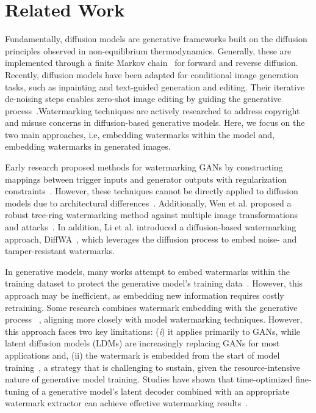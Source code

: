 \section{Related Work}
Fundamentally, diffusion models are generative frameworks built on the diffusion principles observed in non-equilibrium thermodynamics. Generally, these are implemented through a finite Markov chain~\citep{geyer1992practical} for forward and reverse diffusion. Recently, diffusion models have been adapted for conditional image generation tasks, such as inpainting and text-guided generation and editing. Their iterative de-noising steps enables zero-shot image editing by guiding the generative process~\citep{heusel2017gans,salimans2016improved,zhou2019hype}.Watermarking techniques are actively researched to address copyright and misuse concerns in diffusion-based generative models. Here, we focus on the two main approaches, i.e, embedding watermarks within the model and, embedding watermarks in generated images.

Early research proposed methods for watermarking GANs by constructing mappings between trigger inputs and generator outputs with regularization constraints~\citep{yu2021artificial,ong2021protecting,fei2022supervised}. However, these techniques cannot be directly applied to diffusion models due to architectural differences~\citep{creswell2018generative,cao2022survey}. Additionally, Wen et al. proposed a robust tree-ring watermarking method against multiple image transformations and attacks~\citep{wen2023tree}. In addition, Li et al. introduced a diffusion-based watermarking approach, DiffWA~\citep{li2023diffwa}, which leverages the diffusion process to embed noise- and tamper-resistant watermarks.

In generative models, many works attempt to embed watermarks within the training dataset to protect the generative model's training data~\citep{chai2020what}. However, this approach may be inefficient, as embedding new information requires costly retraining. Some research combines watermark embedding with the generative process ~\citep{gragnaniello2021are,wang2020cnn}, aligning more closely with model watermarking techniques. However, this approach faces two key limitations: (\textit{i}) it applies primarily to GANs, while latent diffusion models (LDMs) are increasingly replacing GANs for most applications and, (ii) the watermark is embedded from the start of model training~\citep{fei2022supervised,lin2022cycleganwm}, a strategy that is challenging to sustain, given the resource-intensive nature of generative model training. Studies have shown that time-optimized fine-tuning of a generative model's latent decoder combined with an appropriate watermark extractor can achieve effective watermarking results~\citep{fernandez2023stable}.